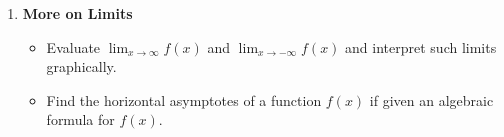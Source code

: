 \documentclass{article}
\begin{document}
\begin{enumerate}[start=8, topsep=0pt]
\begin{itemize}
\item Use algebraic methods to determine whether a limit is $\pm \infty$.

\end{itemize}

\item \textbf{More on Limits} %
\begin{itemize}
\item Evaluate $\displaystyle \lim_{x \to \infty} f(x)$ and $\displaystyle \lim_{x \to -\infty} f(x)$ and interpret such limits graphically.

\item Find the horizontal asymptotes of a function $f(x)$ if given an algebraic formula for $f(x)$. 
\end{itemize}
\end{enumerate}
\end{document}
